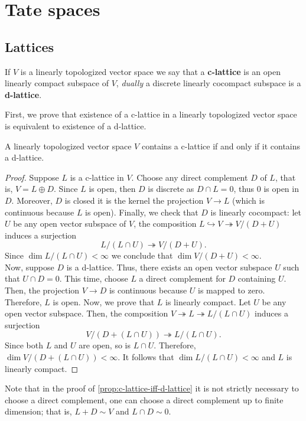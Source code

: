 \section{Tate spaces}
\subsection*{Lattices}
\begin{definition}\label{def:c-lattice}
	If $V$ is a linearly topologized vector space we say that a \textbf{c-lattice} is an open linearly compact subspace of $V$, \textit{dually} a discrete linearly cocompact subspace is a \textbf{d-lattice}.
\end{definition}
First, we prove that existence of a c-lattice in a linearly topologized vector space is equivalent to existence of a d-lattice.
\begin{proposition}\label{prop:c-lattice-iff-d-lattice}
	A linearly topologized vector space $V$ contains a c-lattice if and only if it contains a d-lattice. 
\end{proposition}
\begin{proof}
	Suppose $L$ is a c-lattice in $V$. Choose any direct complement $D$ of $L$, that is, $V = L \oplus D$. Since $L$ is open, then $D$ is discrete as $D\cap L = 0$, thus ${0}$ is open in $D$. Moreover, $D$ is closed it is the kernel the projection $V \to L$ (which is continuous because $L$ is open). Finally, we check that $D$ is linearly cocompact: let $U$ be any open vector subspace of $V$, the composition $L \hookrightarrow V \twoheadrightarrow V/(D+U)$ induces a surjection 
	\[
		L/(L \cap U) \twoheadrightarrow V/(D+U).
	\]
	Since $\dim L / (L \cap U) < \infty$ we conclude that $\dim V/(D+U) < \infty$. \\
	Now, suppose $D$ is a d-lattice. Thus, there exists an open vector subspace $U$ such that $U \cap D = 0$. This time, choose $L$ a direct complement for $D$ containing $U$. Then, the projection $V \to D$ is continuous because $U$ is mapped to zero. Therefore, $L$ is open. Now, we prove that $L$ is linearly compact. Let $U$ be any open vector subspace. Then, the composition $V \twoheadrightarrow L \twoheadrightarrow L/(L \cap U)$ induces a surjection
	 \[
	 	V/(D + (L \cap U)) \twoheadrightarrow L/(L \cap U).
	 \]
	 Since both $L$ and $U$ are open, so is $L\cap U$. Therefore, $\dim V/(D + (L \cap U)) < \infty$. It follows that $\dim L/(L \cap U) < \infty$ and $L$ is linearly compact.  
\end{proof}
\begin{remark}\label{up-to-finite-dimension}
	Note that in the proof of \cref{prop:c-lattice-iff-d-lattice} it is not strictly necessary to choose a direct complement, one can choose a direct complement up to finite dimension; that is, $L + D \sim V$ and $L \cap D \sim 0$. 
\end{remark}
